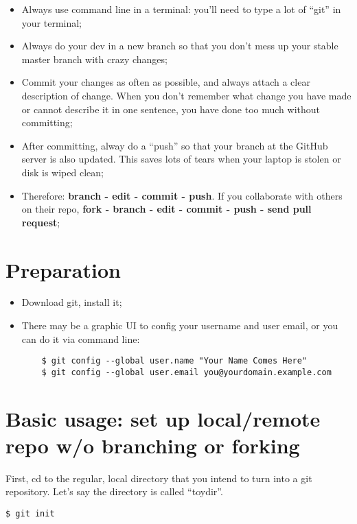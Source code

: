 \documentclass{article} %
\newcommand{\q}[1]{``#1''}
\begin{document}
\begin{itemize}
	\item Always use command line in a terminal: you'll need to type a lot of \q{git} in your terminal;
	\item Always do your dev in a new branch so that you don't mess up your stable master branch with crazy changes;
	\item Commit your changes as often as possible, and always attach a clear description of change. When you don't remember what change you have made or cannot describe it in one sentence, you have done too much without committing;
	\item After committing, alway do a \q{push} so that your branch at the GitHub server is also updated. This saves lots of tears when your laptop is stolen or disk is wiped clean;
	\item Therefore: \textbf{branch - edit - commit - push}. If you collaborate with others on their repo, \textbf{fork - branch - edit - commit - push - send pull request};
\end{itemize}

\section{Preparation}

\begin{itemize}
	\item Download git, install it;
	\item There may be a graphic UI to config your username and user email, or you can do it via command line:

\begin{lstlisting}
	$ git config --global user.name "Your Name Comes Here"
	$ git config --global user.email you@yourdomain.example.com
\end{lstlisting}

\end{itemize}

\section{Basic usage: set up local/remote repo w/o branching or forking}

First, cd to the regular, local directory that you intend to turn into a git repository. Let's say the directory is called \q{toydir}.

\begin{lstlisting}
$ git init
\end{lstlisting}
\end{document}
